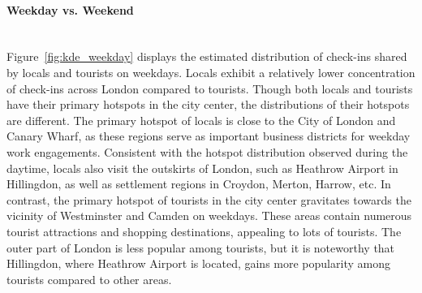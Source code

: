 \documentclass{article}
\newcommand{\subsubsubsection}[1]{\paragraph{#1}\mbox{}\\}
\theoremstyle{definition}
\theoremstyle{remark}
\begin{document}
\subsubsubsection{Weekday vs. Weekend}
Figure~\ref{fig:kde_weekday} displays the estimated distribution of check-ins shared by locals and tourists on weekdays. Locals exhibit a relatively lower concentration of check-ins across London compared to tourists. Though both locals and tourists have their primary hotspots in the city center, the distributions of their hotspots are different. The primary hotspot of locals is close to the City of London and Canary Wharf, as these regions serve as important business districts for weekday work engagements. Consistent with the hotspot distribution observed during the daytime, locals also visit the outskirts of London, such as Heathrow Airport in Hillingdon, as well as settlement regions in Croydon, Merton, Harrow, etc. In contrast, the primary hotspot of tourists in the city center gravitates towards the vicinity of Westminster and Camden on weekdays. These areas contain numerous tourist attractions and shopping destinations, appealing to lots of tourists. The outer part of London is less popular among tourists, but it is noteworthy that Hillingdon, where Heathrow Airport is located, gains more popularity among tourists compared to other areas.
\end{document}
